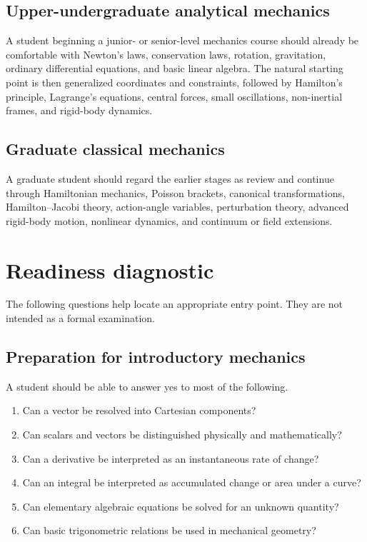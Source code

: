 \subsection*{Upper-undergraduate analytical mechanics}

A student beginning a junior- or senior-level mechanics course should already be comfortable with
Newton's laws, conservation laws, rotation, gravitation, ordinary differential equations, and
basic linear algebra.  The natural starting point is then generalized coordinates and constraints,
followed by Hamilton's principle, Lagrange's equations, central forces, small oscillations,
non-inertial frames, and rigid-body dynamics.

\subsection*{Graduate classical mechanics}

A graduate student should regard the earlier stages as review and continue through Hamiltonian
mechanics, Poisson brackets, canonical transformations, Hamilton--Jacobi theory, action-angle
variables, perturbation theory, advanced rigid-body motion, nonlinear dynamics, and continuum or
field extensions.

\section{Readiness diagnostic}

The following questions help locate an appropriate entry point.  They are not intended as a formal
examination.

\subsection*{Preparation for introductory mechanics}

A student should be able to answer yes to most of the following.
\begin{enumerate}
\item Can a vector be resolved into Cartesian components?
\item Can scalars and vectors be distinguished physically and mathematically?
\item Can a derivative be interpreted as an instantaneous rate of change?
\item Can an integral be interpreted as accumulated change or area under a curve?
\item Can elementary algebraic equations be solved for an unknown quantity?
\item Can basic trigonometric relations be used in mechanical geometry?
\end{enumerate}

